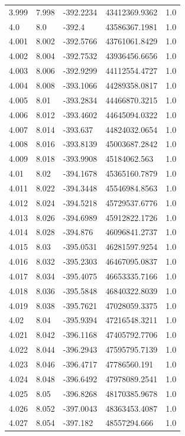 \begin{tabular}{lllll}
3.999 & 7.998 & -392.2234 & 43412369.9362 & 1.0 \\
4.0 & 8.0 & -392.4 & 43586367.1981 & 1.0 \\
4.001 & 8.002 & -392.5766 & 43761061.8429 & 1.0 \\
4.002 & 8.004 & -392.7532 & 43936456.6656 & 1.0 \\
4.003 & 8.006 & -392.9299 & 44112554.4727 & 1.0 \\
4.004 & 8.008 & -393.1066 & 44289358.0817 & 1.0 \\
4.005 & 8.01 & -393.2834 & 44466870.3215 & 1.0 \\
4.006 & 8.012 & -393.4602 & 44645094.0322 & 1.0 \\
4.007 & 8.014 & -393.637 & 44824032.0654 & 1.0 \\
4.008 & 8.016 & -393.8139 & 45003687.2842 & 1.0 \\
4.009 & 8.018 & -393.9908 & 45184062.563 & 1.0 \\
4.01 & 8.02 & -394.1678 & 45365160.7879 & 1.0 \\
4.011 & 8.022 & -394.3448 & 45546984.8563 & 1.0 \\
4.012 & 8.024 & -394.5218 & 45729537.6776 & 1.0 \\
4.013 & 8.026 & -394.6989 & 45912822.1726 & 1.0 \\
4.014 & 8.028 & -394.876 & 46096841.2737 & 1.0 \\
4.015 & 8.03 & -395.0531 & 46281597.9254 & 1.0 \\
4.016 & 8.032 & -395.2303 & 46467095.0837 & 1.0 \\
4.017 & 8.034 & -395.4075 & 46653335.7166 & 1.0 \\
4.018 & 8.036 & -395.5848 & 46840322.8039 & 1.0 \\
4.019 & 8.038 & -395.7621 & 47028059.3375 & 1.0 \\
4.02 & 8.04 & -395.9394 & 47216548.3211 & 1.0 \\
4.021 & 8.042 & -396.1168 & 47405792.7706 & 1.0 \\
4.022 & 8.044 & -396.2943 & 47595795.7139 & 1.0 \\
4.023 & 8.046 & -396.4717 & 47786560.191 & 1.0 \\
4.024 & 8.048 & -396.6492 & 47978089.2541 & 1.0 \\
4.025 & 8.05 & -396.8268 & 48170385.9678 & 1.0 \\
4.026 & 8.052 & -397.0043 & 48363453.4087 & 1.0 \\
4.027 & 8.054 & -397.182 & 48557294.666 & 1.0 \\

\end{tabular}
